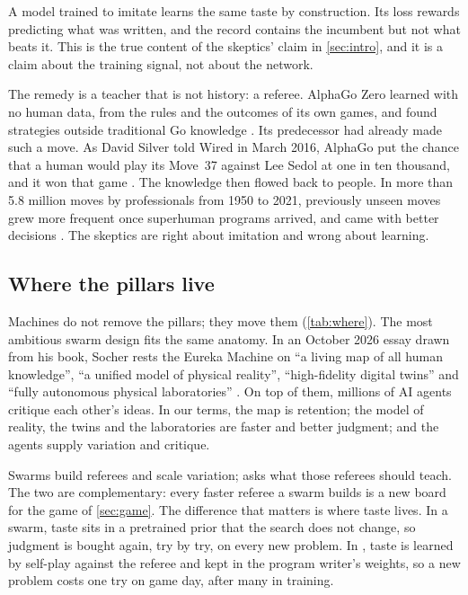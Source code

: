 A model trained to imitate learns the same taste by construction. Its loss rewards predicting what was written, and the record contains the incumbent but not what beats it. This is the true content of the skeptics' claim in \cref{sec:intro}, and it is a claim about the training signal, not about the network.

The remedy is a teacher that is not history: a referee. AlphaGo Zero learned with no human data, from the rules and the outcomes of its own games, and found strategies outside traditional Go knowledge \citep{silver2017mastering}. Its predecessor had already made such a move. As David Silver told Wired in March 2016, AlphaGo put the chance that a human would play its Move~37 against Lee Sedol at one in ten thousand, and it won that game \citep{metz2016twomoves}. The knowledge then flowed back to people. In more than 5.8 million moves by professionals from 1950 to 2021, previously unseen moves grew more frequent once superhuman programs arrived, and came with better decisions \citep{shin2023superhuman}. The skeptics are right about imitation and wrong about learning.

\subsection{Where the pillars live}\label{sub:anatomy-where}

Machines do not remove the pillars; they move them (\cref{tab:where}). The most ambitious swarm design fits the same anatomy. In an October 2026 essay drawn from his book, Socher rests the Eureka Machine on ``a living map of all human knowledge'', ``a unified model of physical reality'', ``high-fidelity digital twins'' and ``fully autonomous physical laboratories'' \citep{socher2026bookbite,socher2026eureka}. On top of them, millions of AI agents critique each other's ideas. In our terms, the map is retention; the model of reality, the twins and the laboratories are faster and better judgment; and the agents supply variation and critique.

Swarms build referees and scale variation; \EZ{} asks what those referees should teach. The two are complementary: every faster referee a swarm builds is a new board for the game of \cref{sec:game}. The difference that matters is where taste lives. In a swarm, taste sits in a pretrained prior that the search does not change, so judgment is bought again, try by try, on every new problem. In \EZ{}, taste is learned by self-play against the referee and kept in the program writer's weights, so a new problem costs one try on game day, after many in training.

